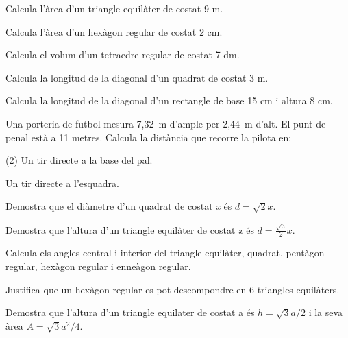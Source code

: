\begin{mylist}

\exer  Calcula l'àrea d'un triangle equilàter de costat 9 m. 

\exer  Calcula l'àrea d'un hexàgon regular de costat 2 cm. 

\exer  \hot Calcula el volum d'un tetraedre regular de costat 7 dm.

\exer  Calcula la longitud de la diagonal d'un quadrat de costat 3 m.

\exer  Calcula la longitud de la diagonal d'un rectangle de base 15 cm i altura 8 cm.
\answers{17 cm}

\exer  Una porteria de futbol mesura 7,32~m d'ample per 2,44~m d'alt. El punt de penal està a 11 metres. Calcula la distància que recorre la pilota en:

\begin{tasks}(2)
	\task  Un tir directe a la base del pal.

 
	\task  Un tir directe a l'esquadra.
\end{tasks}
\answers{[11.593 m, 11.84 m]}


\exer  Demostra que el diàmetre d'un quadrat de costat \textit{x} és $d=\sqrt{2} x$.
 

\exer  Demostra que l'altura d'un triangle equilàter de costat \textit{x} és $d=\frac{\sqrt{3} }{2} x$. 
 

\exer  Calcula els angles central i interior del triangle equilàter, quadrat, pentàgon regular, hexàgon regular i enneàgon regular.

\exer  Justifica que un hexàgon regular es pot descompondre en 6 triangles equilàters.

\exer  Demostra que l'altura d'un triangle equilater de costat a és $h=\sqrt{3} a/2$ i la seva àrea $A=\sqrt{3} a^2 /4$.


\end{mylist}
